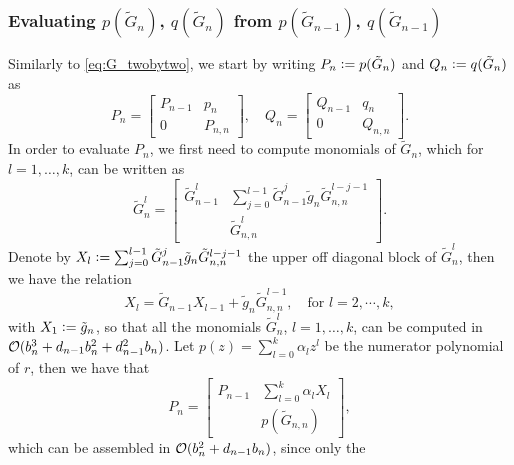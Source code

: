 \subsubsection{Evaluating $p(\tilde{G}_n)$, $q(\tilde{G}_n)$ from $p(\tilde{G}_{n-1})$, $q(\tilde{G}_{n-1})$}
Similarly to \eqref{eq:G_twobytwo}, we start by writing $P_n\mathrel{\mathop:}= p(\tilde{G}_n)$ and $Q_n\mathrel{\mathop:}= q(\tilde{G}_n)$ as
\begin{equation*}
    P_n = 
    \begin{bmatrix}
        P_{n-1} & p_n \\
        0       & P_{n,n}
    \end{bmatrix},
    \quad
    Q_n = 
    \begin{bmatrix}
        Q_{n-1} & q_n \\
        0       & Q_{n,n}
    \end{bmatrix}.
\end{equation*}
In order to evaluate $P_{n}$, we first need to compute monomials of $\tilde{G}_{n}$, which for $l = 1, \dotsc, k$, can be written as
\begin{equation*}
    \tilde{G}_{n}^l =
    \begin{bmatrix}
        \tilde{G}_{n-1}^l & \sum_{j=0}^{l-1}
            \tilde{G}_{n-1}^j \tilde{g}_{n} \tilde{G}_{n,n}^{l-j-1} \\
        &                   \tilde{G}_{n,n}^l
    \end{bmatrix}.
\end{equation*}
Denote by $X_l \mathrel{\mathop:}= \sum_{j=0}^{l-1} \tilde{G}_{n-1}^j
\tilde{g}_{n} \tilde{G}_{n,n}^{l-j-1}$ the upper off diagonal block of
$\tilde{G}_n^l$, then we have the relation
\begin{equation*}
    X_{l} = \tilde{G}_{n-1}X_{l-1} + \tilde{g}_n \tilde{G}_{n,n}^{l-1}, \quad \text{for } l = 2, \cdots, k,
\end{equation*}
with $X_{1} \mathrel{\mathop:}= \tilde{g}_n$, so that all the monomials $\tilde{G}_n^l$, $l = 1, \dotsc, k$, can be
computed in ${\mathcal O}(b_n^3 + d_{n-1} b_n^2 + d_{n-1}^2 b_n)$.  Let $p(z)
= \sum_{l=0}^k \alpha_l z^l$ be the numerator polynomial of $r$, then
we have that
\begin{equation}
    \label{eq:P_n}
    P_n = 
    \begin{bmatrix}
        P_{n-1} & \sum_{l=0}^{k} \alpha_l X_l\\
                & p(\tilde{G}_{n,n})
    \end{bmatrix},
\end{equation}
which can be assembled in ${\mathcal O}(b_n^2 + d_{n-1} b_n)$, since only the
